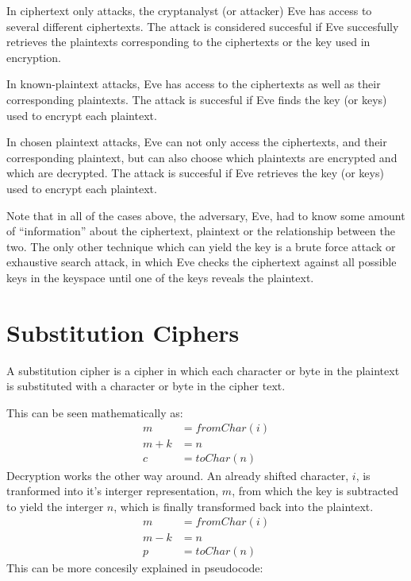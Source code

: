 \documentclass[12pt, a4paper, draft]{report}
\begin{document}
In ciphertext only attacks, the cryptanalyst (or attacker) Eve has access
to several different ciphertexts. The attack is considered succesful if
Eve succesfully retrieves the plaintexts corresponding to the ciphertexts
or the key used in encryption.

In known-plaintext attacks, Eve has access to the ciphertexts as well
as their corresponding plaintexts. The attack is succesful if Eve
finds the key (or keys) used to encrypt each plaintext.

In chosen plaintext attacks, Eve can not only access the ciphertexts,
and their corresponding plaintext, but can also choose which plaintexts
are encrypted and which are decrypted. The attack is succesful if Eve
retrieves the key (or keys) used to encrypt each plaintext.

Note that in all of the cases above, the adversary, Eve, had to know
some amount of ``information'' about the ciphertext, plaintext or the
relationship between the two. The only other technique which can yield
the key is a brute force attack or exhaustive search attack, in which
Eve checks the ciphertext against all possible keys in the keyspace until
one of the keys reveals the plaintext.


\section{Substitution Ciphers}


A substitution cipher is a cipher in which each character or byte in the
plaintext is substituted with a character or byte in the cipher text.

This can be seen mathematically as:
\begin{align*}
    m & = fromChar(i)\\
    m + k & = n\\
    c & = toChar(n)
\end{align*}
Decryption works the other way around. An already shifted character, $i$,
is tranformed into it's interger representation, $m$, from which the key
is subtracted to yield the interger $n$, which is finally transformed back
into the plaintext.
\begin{align*}
    m & = fromChar(i)\\
    m - k & = n\\
    p & = toChar(n)
\end{align*}
This can be more concesily explained in pseudocode:
\end{document}
